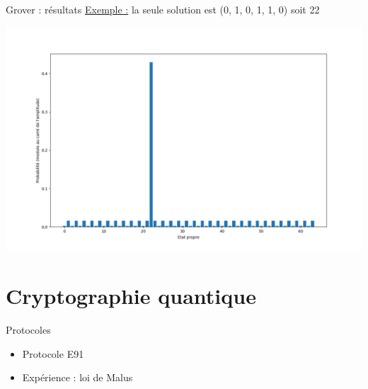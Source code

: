 \documentclass[french]{beamer}
\begin{document}
\begin{frame}{Grover : résultats}
    \underline{Exemple :} la seule solution est (0, 1, 0, 1, 1, 0) soit 22
    \begin{center}
        \includegraphics[scale=0.3]{Grover.png}
    \end{center}
\end{frame}


\section{Cryptographie quantique}

\begin{frame}{Protocoles}
    \begin{itemize}
        \item<1-> Protocole E91
        \item<2-> Expérience : loi de Malus
    \end{itemize}
\end{frame}
\end{document}
